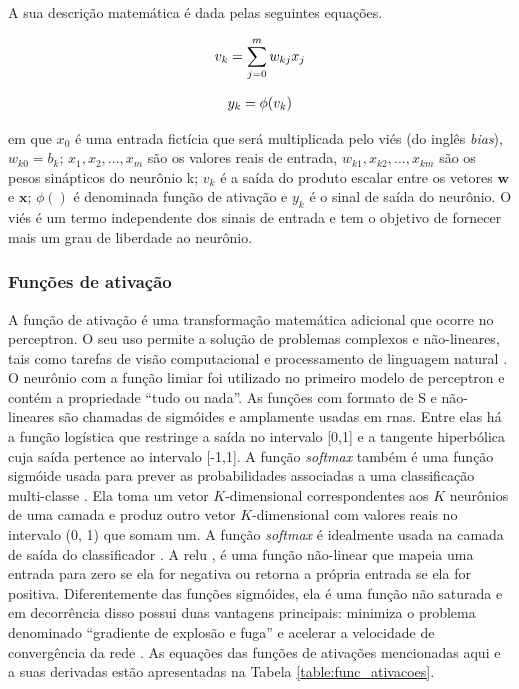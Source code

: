 A sua descrição matemática é dada pelas seguintes equações.

\begin{equation}
\begin{aligned}
\centering    
v_{k} = \sum_{j=0}^{m}w_{kj}x_{j} 
\end{aligned}
\end{equation}


\begin{equation}
\begin{aligned}
\centering    
y_{k} = \phi(v_{k})
\end{aligned}
\end{equation}

\noindent em que $x_{0}$ é uma entrada fictícia que será multiplicada pelo viés (do inglês \textit{bias}), $w_{k0} = b_{k}$; $x_{1},x_{2}, ...,x_{m}$ são os valores reais de entrada, $w_{k1},x_{k2}, ...,x_{km}$ são os pesos sinápticos do neurônio k; $v_{k}$ é a saída do produto escalar entre os vetores $\textbf{w}$ e $ \textbf{x}$;  $\phi()$ é denominada função de ativação e $y_{k}$ é o sinal de saída do neurônio. O viés é um termo independente dos sinais de entrada e tem o objetivo de fornecer mais um grau de liberdade ao neurônio.


\subsubsection{Funções de ativação}
A função de ativação é uma transformação matemática adicional que ocorre no perceptron. O seu uso permite a solução de problemas complexos e não-lineares, tais como tarefas de visão computacional e processamento de linguagem natural \cite{Mitchell}. 
O neurônio com a função limiar foi utilizado no primeiro modelo de perceptron \cite{mcculloch1943logical,Haykin} e contém a propriedade ``tudo ou nada''.  As funções com formato de S e não-lineares são chamadas de sigmóides e amplamente usadas em \acrshort{rna}s. Entre elas há a função logística que restringe a saída no intervalo [0,1] e a tangente hiperbólica cuja saída pertence ao intervalo [-1,1]. 
A função \textit{softmax} também é uma função sigmóide usada para prever as probabilidades associadas a uma classificação multi-classe \cite{Goodfellow2016}.  Ela toma um vetor $K$-dimensional correspondentes aos $K$ neurônios de uma camada e produz outro vetor $K$-dimensional com valores reais no intervalo (0, 1) que somam um.  A função \textit{softmax} é idealmente usada na camada de saída do classificador \cite{Goodfellow2016}.
A \gls{relu} \cite{nair2010rectified}, é uma função não-linear que mapeia uma entrada para zero se ela for negativa ou retorna a própria entrada se ela for positiva. Diferentemente das funções sigmóides, ela é uma função não saturada e em decorrência disso possui duas vantagens principais: minimiza o problema denominado “gradiente de explosão e fuga” e acelerar a velocidade de convergência da rede \cite{xu2015empirical}.
As equações das funções de ativações mencionadas aqui e a suas derivadas estão apresentadas na Tabela \ref{table:func_ativacoes}. 

